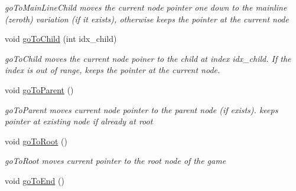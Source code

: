 \begin{DoxyCompactItemize}
\begin{DoxyCompactList}\small\item\em go\-To\-Main\-Line\-Child moves the current node pointer one down to the mainline (zeroth) variation (if it exists), otherwise keeps the pointer at the current node \end{DoxyCompactList}\item 
void \hyperlink{classchess_1_1Game_a6b634132c4549290bd1bedd2444f7072}{go\-To\-Child} (int idx\-\_\-child)
\begin{DoxyCompactList}\small\item\em go\-To\-Child moves the current node poiner to the child at index idx\-\_\-child. If the index is out of range, keeps the pointer at the current node. \end{DoxyCompactList}\item 
\hypertarget{classchess_1_1Game_a192a5708f9cc181ceff6bfd0eb2fc883}{void \hyperlink{classchess_1_1Game_a192a5708f9cc181ceff6bfd0eb2fc883}{go\-To\-Parent} ()}\label{classchess_1_1Game_a192a5708f9cc181ceff6bfd0eb2fc883}

\begin{DoxyCompactList}\small\item\em go\-To\-Parent moves current node pointer to the parent node (if exists). keeps pointer at existing node if already at root \end{DoxyCompactList}\item 
\hypertarget{classchess_1_1Game_aa14b8365fc4c0a472b00a214fd67e302}{void \hyperlink{classchess_1_1Game_aa14b8365fc4c0a472b00a214fd67e302}{go\-To\-Root} ()}\label{classchess_1_1Game_aa14b8365fc4c0a472b00a214fd67e302}

\begin{DoxyCompactList}\small\item\em go\-To\-Root moves current pointer to the root node of the game \end{DoxyCompactList}\item 
\hypertarget{classchess_1_1Game_ad421efa010dedf785ad2c6211910167f}{void \hyperlink{classchess_1_1Game_ad421efa010dedf785ad2c6211910167f}{go\-To\-End} ()}\label{classchess_1_1Game_ad421efa010dedf785ad2c6211910167f}


\end{DoxyCompactItemize}
